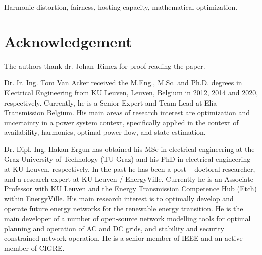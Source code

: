 \documentclass[journal]{IEEEtran}
\begin{document}
\begin{IEEEkeywords}
Harmonic distortion, fairness, hosting capacity, mathematical optimization.
\end{IEEEkeywords}

\IEEEpeerreviewmaketitle








\section*{Acknowledgement}
The authors thank dr. Johan~Rimez for proof reading the paper.




\begin{IEEEbiographynophoto}{Dr. Ir. Ing. Tom Van Acker} received the M.Eng., M.Sc. and Ph.D. degrees in Electrical Engineering from KU Leuven, Leuven, Belgium in 2012, 2014 and 2020, respectively. Currently, he is a Senior Expert and Team Lead at Elia Transmission Belgium. His main areas of research interest are optimization and uncertainty in a power system context, specifically applied in the context of availability, harmonics, optimal power flow, and state estimation. 
\end{IEEEbiographynophoto}

\begin{IEEEbiographynophoto}{Dr. Dipl.-Ing. Hakan Ergun} has obtained his MSc in electrical engineering at the Graz University of Technology (TU Graz) and his PhD in electrical engineering at KU Leuven, respectively. In the past he has been a post – doctoral researcher, and a research expert at KU Leuven / EnergyVille. Currently he is an Associate Professor with KU Leuven and the Energy Transmission Competence Hub (Etch) within EnergyVille.
His main research interest is to optimally develop and operate future energy networks for the renewable energy transition. He is the main developer of a number of open-source network modelling tools for optimal planning and operation of AC and DC grids, and stability and security constrained network operation. He is a senior member of IEEE and an active member of CIGRE. 

\end{IEEEbiographynophoto}
\end{document}
